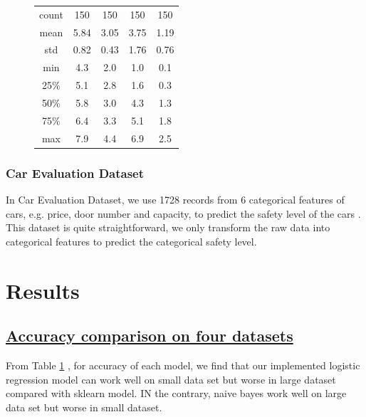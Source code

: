 \documentclass[11pt]{scrartcl}
\begin{document}
\begin{figure}[H]
\begin{minipage}{0.8\linewidth}
\begin{minipage}[b]{0.4\linewidth}
\begin{tabular}{c|cccc}
				\hline
				count & 150 & 150 & 150 & 150\\
				mean & 5.84 & 3.05 & 3.75 & 1.19\\
				std & 0.82 & 0.43 & 1.76 & 0.76\\
				min & 4.3 & 2.0 & 1.0 & 0.1 \\
				25\% & 5.1 & 2.8 & 1.6 & 0.3\\
				50\% & 5.8 & 3.0 & 4.3 & 1.3\\
				75\% & 6.4 & 3.3 & 5.1 & 1.8 \\
				max & 7.9 & 4.4  & 6.9 & 2.5 \\
				\hline
			\end{tabular} 
		\label{iris_table}
		\end{minipage}
	\end{minipage}
\end{figure}


\subsubsection*{Car Evaluation Dataset}
In Car Evaluation Dataset, we use 1728 records from 6 categorical features of cars, e.g. price, door number and capacity, to predict the safety level of the cars \cite{bohanec1988knowledge}. This dataset is quite straightforward, we only transform the raw data into categorical features to predict the categorical safety level.


\section{Results}
\subsection*{\underline{Accuracy comparison on four datasets}}

From Table \ref{} , for accuracy of each model, we find that our implemented logistic regression model can work well on small data set but worse in large dataset compared with sklearn model. IN the contrary, naive bayes work well on large data set but worse in small dataset.
\end{document}
